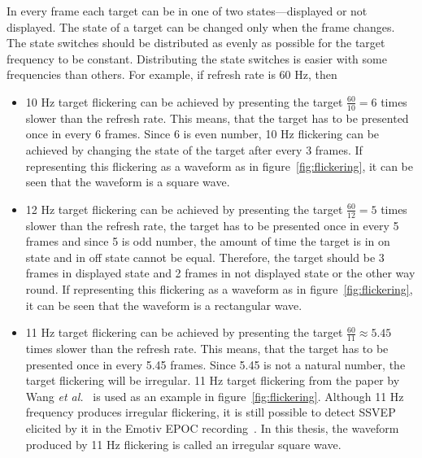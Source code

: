 In every frame each \gls{target} can be in one of two states---displayed or not displayed. The state of a \gls{target} can be changed only when the frame changes. The state switches should be distributed as evenly as possible for the target frequency to be constant. Distributing the state switches is easier with some frequencies than others. For example, if refresh rate is 60 Hz, then
\begin{itemize}
	\item 10 Hz \gls{target} \gls{flickering} can be achieved by presenting the \gls{target} $\frac{60}{10}=6$ times slower than the refresh rate. This means, that the \gls{target} has to be presented once in every 6 frames. Since 6 is even number, 10 Hz \gls{flickering} can be achieved by changing the state of the \gls{target} after every 3 frames. If representing this \gls{flickering} as a waveform as in figure~\ref{fig:flickering}, it can be seen that the waveform is a \gls{square wave}.
	\item 12 Hz \gls{target} \gls{flickering} can be achieved by presenting the \gls{target} $\frac{60}{12}=5$ times slower than the refresh rate, the \gls{target} has to be presented once in every 5 frames and since 5 is odd number, the amount of time the target is in on state and in off state cannot be equal. Therefore, the \gls{target} should be 3 frames in displayed state and 2 frames in not displayed state or the other way round. If representing this \gls{flickering} as a waveform as in figure~\ref{fig:flickering}, it can be seen that the waveform is a \gls{rectangular wave}.
	\item 11 Hz \gls{target} \gls{flickering} can be achieved by presenting the \gls{target} $\frac{60}{11}\approx 5.45$ times slower than the refresh rate. This means, that the \gls{target} has to be presented once in every 5.45 frames. Since 5.45 is not a natural number, the \gls{target} \gls{flickering} will be irregular. 11 Hz target \gls{flickering} from the paper by Wang \textit{et al.}~\cite{11hz} is used as an example in figure~\ref{fig:flickering}. Although 11 Hz frequency produces irregular \gls{flickering}, it is still possible to detect \gls{SSVEP} elicited by it in the Emotiv EPOC recording~\cite{emotiv_11hz}. In this thesis, the waveform produced by 11 Hz \gls{flickering} is called an \gls{irregular square wave}.
\end{itemize}

